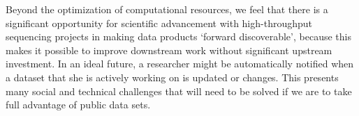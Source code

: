 \documentclass[a4paper,num-refs]{oup-contemporary}
\begin{document}
Beyond the optimization of computational resources, we feel that there
is a significant opportunity for scientific advancement with
high-throughput sequencing projects in making data products `forward
discoverable', because this makes it possible to improve downstream
work without significant upstream investment.  In an ideal future, a
researcher might be automatically notified when a dataset that she is
actively working on is updated or changes. This presents many social
and technical challenges that will need to be solved if we are to take
full advantage of public data sets.




\end{document}
